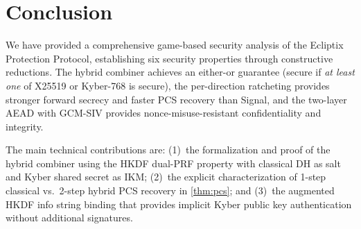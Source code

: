 \documentclass[11pt,a4paper]{article}
\theoremstyle{definition}
\theoremstyle{remark}
\begin{document}
\section{Conclusion}
\label{sec:conclusion}

We have provided a comprehensive game-based security analysis of the Ecliptix
Protection Protocol, establishing six security properties through constructive
reductions.  The hybrid combiner achieves an either-or guarantee (secure if
\emph{at least one} of X25519 or Kyber-768 is secure), the per-direction
ratcheting provides stronger forward secrecy and faster PCS recovery than
Signal, and the two-layer AEAD with GCM-SIV provides nonce-misuse-resistant
confidentiality and integrity.

The main technical contributions are: (1)~the formalization and proof of the
hybrid combiner using the HKDF dual-PRF property with classical DH as salt
and Kyber shared secret as IKM; (2)~the explicit characterization of 1-step
classical vs.\ 2-step hybrid PCS recovery in \cref{thm:pcs}; and (3)~the
augmented HKDF info string binding that provides implicit Kyber public key
authentication without additional signatures.
\end{document}

